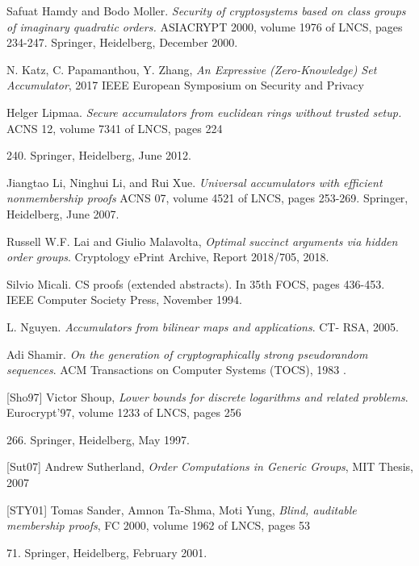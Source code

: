 \documentclass[11pt, lettersize, notitlepage, leqno, footskip=0.6cm]{article}
\newcommand{\noin}{\noindent}
\numberwithin{equation}{section}
\begin{document}
\noin [HM00] Safuat Hamdy and Bodo Moller. \textit{Security of cryptosystems based on class groups of imaginary quadratic orders.} ASIACRYPT 2000, volume 1976 of LNCS, pages 234-247.
Springer, Heidelberg, December 2000.\vspace{0.1cm}

\noin [KPZ17] N. Katz, C. Papamanthou, Y. Zhang, \textit{An Expressive (Zero-Knowledge) Set Accumulator}, 2017 IEEE European Symposium on Security and Privacy \vspace{0.1cm}

\noin [Lip12] Helger Lipmaa. \textit{Secure accumulators from euclidean rings without trusted setup.} ACNS 12, volume 7341 of LNCS, pages 224{240. Springer, Heidelberg, June 2012.\vspace{0.1cm}

\noin [LLX07] Jiangtao Li, Ninghui Li, and Rui Xue.  \textit{Universal accumulators with efficient nonmembership proofs} ACNS 07, volume 4521 of LNCS, pages 253-269. Springer, Heidelberg, June 2007.\vspace{0.1cm}

\noin [LM18] Russell W.F. Lai and Giulio Malavolta,  \textit{Optimal succinct arguments via hidden order groups}. Cryptology ePrint Archive, Report 2018/705, 2018. \vspace{0.1cm}

\noin [Mic94] Silvio Micali. CS proofs (extended abstracts). In 35th FOCS, pages 436-453. IEEE Computer Society Press, November 1994.\vspace{0.1cm}

\noin [Ngu05] L. Nguyen. \textit{Accumulators from bilinear maps and applications}. CT-
RSA, 2005. \vspace{0.1cm}

\noin [Sha83] Adi Shamir. \textit{On the generation of cryptographically strong pseudorandom
sequences}. ACM Transactions on Computer Systems (TOCS), 1983 \vspace{0.1cm}.

\noin \hypertarget{Sho97}{[Sho97]} Victor Shoup, \textit{Lower bounds for discrete logarithms and related problems}. Eurocrypt'97, volume 1233 of LNCS, pages 256{266. Springer, Heidelberg, May 1997. \vspace{0.1cm}

\noindent \hypertarget{Sut07}{[Sut07]} Andrew Sutherland, \textit{Order Computations in Generic Groups}, MIT Thesis, 2007 \vspace{0.1cm}

\noindent \hypertarget{STY01}{[STY01]} Tomas Sander, Amnon Ta-Shma, Moti Yung, \textit{Blind, auditable membership proofs}, FC 2000, volume 1962 of LNCS, pages 53{71. Springer, Heidelberg, February 2001.\vspace{0.1cm}

}}}
\end{document}

